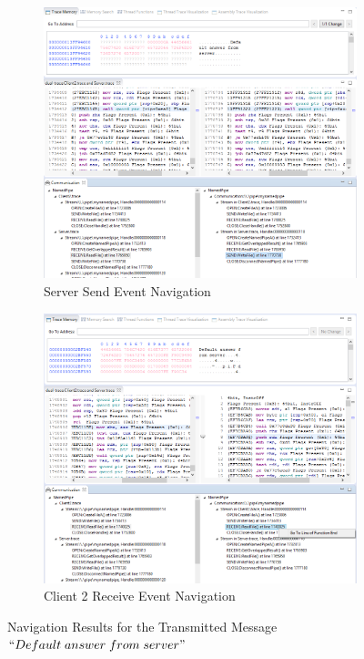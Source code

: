 \begin{figure}[H]
\begin{subfigure}[H]{0.45\linewidth}
\includegraphics[scale=0.35]{Figures/result22_server_send}
 \caption{Server Send Event Navigation}
\label{result22_server_send}
\end{subfigure}
\hfill
\begin{subfigure}[H]{0.45\linewidth}
\includegraphics[scale=0.35]{Figures/result22_client_read}
 \caption{Client 2 Receive Event Navigation}
\label{result22_client_read}
\end{subfigure}%
\caption{Navigation Results for the Transmitted Message $``Default\; answer\; from\; server"$}
\label{result22_server_to_client}
\end{figure}

